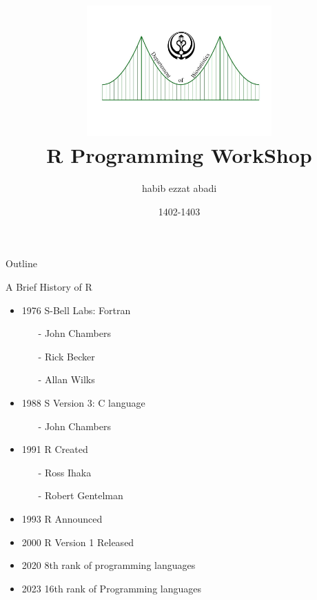 \documentclass{beamer}\usepackage[]{graphicx}\usepackage[]{xcolor}
\date{\small 1402-1403\\[0.5cm]}
\title[R WorkShop]{\includegraphics[height = 5cm, width = 8cm]{Logo_Sums_BioStatistics.pdf}\\  R Programming WorkShop}
\author{habib ezzat abadi}
\institute{Shiraz University of Medical Scinece}
\begin{document}
\frame[plain]{\maketitle}

\begin{frame}{Outline}
    \tableofcontents
\end{frame}


\begin{frame}{A Brief History of R}
 \begin{itemize}
\item 1976 S-Bell Labs: Fortran 
\begin{itemize}
\item[-]John Chambers
\item[-] Rick Becker
\item[-] Allan Wilks 
\end{itemize}
\item 1988 S Version 3: C language 
\begin{itemize}
    \item[-] John Chambers 
\end{itemize}
\item 1991 R Created 
\begin{itemize}
    \item[-] Ross Ihaka
    \item[-] Robert Gentelman 
\end{itemize}
\item 1993 R Announced
\item 2000 R Version 1 Released
\item 2020 8th rank of programming languages
\item 2023 16th rank of Programming languages
 \end{itemize}   
\end{frame}
\end{document}
